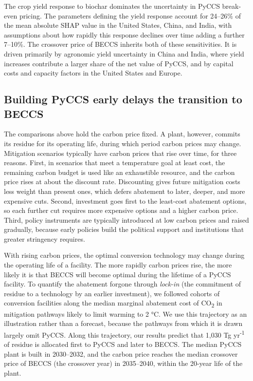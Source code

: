 \documentclass[
  letterpaper,
  twoside,
  twocolumn,
  9pt]{article}
\begin{document}
The crop yield response to biochar dominates the uncertainty in PyCCS
break-even pricing. The parameters defining the yield response account
for 24--26\% of the mean absolute SHAP value in the United States,
China, and India, with assumptions about how rapidly this response
declines over time adding a further 7--10\%. The crossover price of
BECCS inherits both of these sensitivities. It is driven primarily by
agronomic yield uncertainty in China and India, where yield increases
contribute a larger share of the net value of PyCCS, and by capital
costs and capacity factors in the United States and Europe.

\subsection{Building PyCCS early delays the transition to
BECCS}\label{building-pyccs-early-delays-the-transition-to-beccs}

The comparisons above hold the carbon price fixed. A plant, however,
commits its residue for its operating life, during which period carbon
prices may change. Mitigation scenarios typically have carbon prices
that rise over time, for three reasons. First, in scenarios that meet a
temperature goal at least cost, the remaining carbon budget is used like
an exhaustible resource, and the carbon price rises at about the
discount rate.\citep{hotelling1931, emmerling2019} Discounting gives
future mitigation costs less weight than present ones, which defers
abatement to later, deeper, and more expensive cuts. Second, investment
goes first to the least-cost abatement options, so each further cut
requires more expensive options and a higher carbon price. Third, policy
instruments are typically introduced at low carbon prices and raised
gradually, because early policies build the political support and
institutions that greater stringency requires.\citep{pahle2018}

With rising carbon prices, the optimal conversion technology may change
during the operating life of a facility. The more rapidly carbon prices
rise, the more likely it is that BECCS will become optimal during the
lifetime of a PyCCS facility. To quantify the abatement forgone through
\emph{lock-in} (the commitment of residue to a technology by an earlier
investment), we followed cohorts of conversion facilities along the
median marginal abatement cost of CO\textsubscript{2} in mitigation
pathways likely to limit warming to 2 °C.\citep{riahi2022} We use this
trajectory as an illustration rather than a forecast, because the
pathways from which it is drawn largely omit
PyCCS.\citep{edwards2026state} Along this trajectory, our results
predict that 1,030 Tg yr\textsuperscript{-1} of residue is allocated
first to PyCCS and later to BECCS. The median PyCCS plant is built in
2030--2032, and the carbon price reaches the median crossover price of
BECCS (the crossover year) in 2035--2040, within the 20-year life of the
plant.
\end{document}
